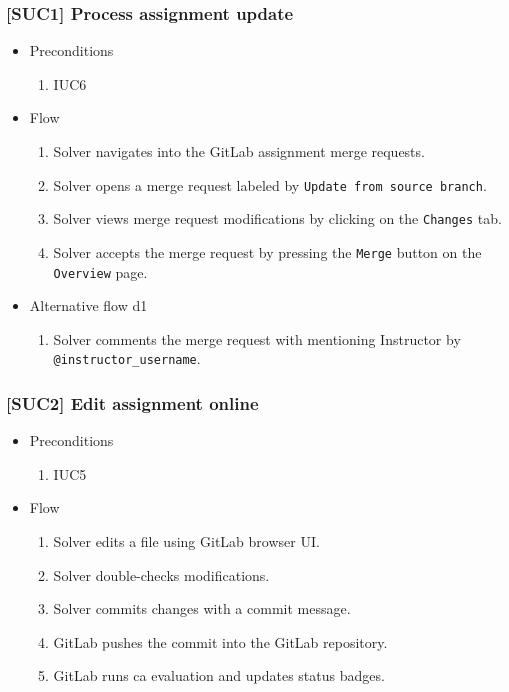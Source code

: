 \subsubsection{{[}SUC1{]} Process assignment update}

\begin{itemize}
\item
  {Preconditions}
    \begin{enumerate}
    \item
      {IUC6}
    \end{enumerate}
\end{itemize}

\begin{itemize}
\item
  {Flow}
    \begin{enumerate}
    \item
      {Solver navigates into the GitLab assignment merge requests.}
    \item
      {Solver opens a merge request labeled by \texttt{Update from source branch}.}
    \item
      {Solver views merge request modifications by clicking on the \texttt{Changes} tab.}
    \item
      {Solver accepts the merge request by pressing the \texttt{Merge} button on the \texttt{Overview} page.}
    \end{enumerate}
\item
  {Alternative flow d1}
    \begin{enumerate}
    \item
      {Solver comments the merge request with mentioning Instructor by \texttt{@instructor\_username}.}
    \end{enumerate}
\end{itemize}

\subsubsection{{[}SUC2{]} Edit assignment online}

\begin{itemize}
\item
  {Preconditions}
    \begin{enumerate}
    \item
      {IUC5}
    \end{enumerate}
\end{itemize}

\begin{itemize}
\item
  {Flow}
    \begin{enumerate}
    \item
      {Solver edits a file using GitLab browser UI.}
    \item
      {Solver double-checks modifications.}
    \item
      {Solver commits changes with a commit message.}
    \item
      {GitLab pushes the commit into the GitLab repository.}
    \item
      {GitLab runs ca evaluation and updates status badges.}
    \end{enumerate}
\end{itemize}


